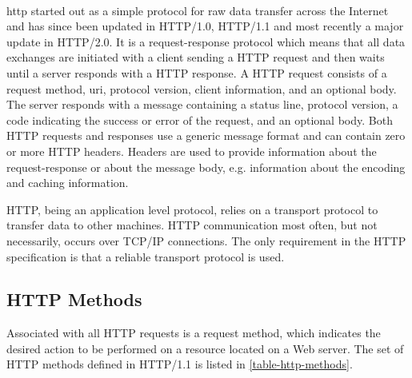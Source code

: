 \paragraph{}

\gls{http} started out as a simple protocol for raw data transfer across the
Internet and has since been updated in HTTP/1.0, HTTP/1.1 and most recently a
major update in HTTP/2.0. It is a request-response protocol which means that all
data exchanges are initiated with a client sending a HTTP request and then waits
until a server responds with a HTTP response. A HTTP request consists of a
request method, \gls{uri}, protocol version, client information, and an optional
body. The server responds with a message containing a status line, protocol
version, a code indicating the success or error of the request, and an optional
body. Both HTTP requests and responses use a generic message format and can
contain zero or more HTTP headers. Headers are used to provide information about
the request-response or about the message body, e.g. information about the
encoding and caching information.

HTTP, being an application level protocol, relies on a transport protocol to
transfer data to other machines. HTTP communication most often, but not
necessarily, occurs over TCP/IP connections. The only requirement in the HTTP
specification is that a reliable transport protocol is used.

\subsection{HTTP Methods}

 Associated with all HTTP requests is a request method, which indicates the
 desired action to be performed on a resource located on a Web server. The set
 of HTTP methods defined in HTTP/1.1 is listed in \cref{table-http-methods}.

